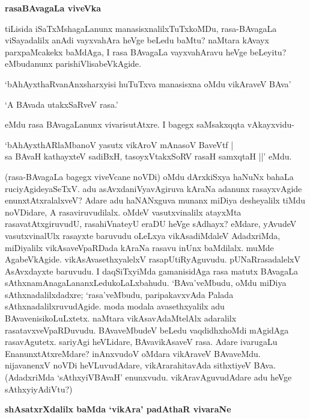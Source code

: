 {\bigskip
\noindent
{\large\bf rasaBAvagaLa viveVka}}\label{page224}
\medskip

\noindent
tiLisida iSaTxMshagaLanunx manasisxnalilxTuTxkoMDu, rasa-BAvagaLa viSayadalilx anAdi vayxvahAra heVge beLedu baMtu? naMtara kAvayx parxpaMcakekx baMdAga, I rasa BAvagaLa vayxvahAravu heVge beLeyitu? eMbudanunx parishiVlisabeVkAgide.

`bAhAyxthaRvanAnxsharxyisi huTuTxva manasisxna oMdu vikAraveV BAva'

`A BAvada utakxSaRveV rasa.'

eMdu rasa BAvagaLanunx vivarisutAtxre. I bagegx saMsakxqqta vAkayxvidu-

\begin{shloka}
`bAhAyxthARlaMbanoV yasutx vikAroV mAnasoV BaveVtf |\\\label{225}
sa BAvaH kathayxteV sadiBxH, tasoyxVtakxSoRV rasaH samxqtaH ||' eMdu.
\end{shloka}

\noindent
(rasa-BAvagaLa bagegx viveVcane noVDi) oMdu dArxkiSxya haNuNx bahaLa ruciyAgide\-yaSeTxV. adu asAvxda\-niVyavAgiruva kAraNa adanunx rasayxvAgide enunxtAtxralalxveV? Adare adu haNANxguva munanx miDi\-ya desheyalilx tiMdu noVDidare, A rasaviruvudilalx. oMdeV vasutxvinalilx atayxMta rasavatAtxgiruvudU, rasahiVnateyU eraDU heVge sAdhayx? eMdare, yAvudeV vasutxvinalUlx rasayxte baruvudu oLeLxya vikAsadiMdaleV AdadxriMda, miDiyalilx vikAsaveVpaRDada kAraNa rasavu inUnx baMdilalx. muMde Aga\-beVkA\-gide. vikAsAvasethxyalelxV rasapUtiRyAguvudu. pUNaRrasadalelxV AsAvxdayxte baruvudu. I daqSiTx\-yiMda gamanisidAga rasa matutx BAvagaLa sAthxnamAnagaLananxLedukoLaLxbahudu. `BAva'veMbudu, oMdu miDiya sAthxnadalilxdadxre; `rasa'veMbudu, paripakavxvAda Palada sAthxnadalilxruvudAgide. moda modala avasethxyalilx adu BAvavenisikoLuLxtetx. naMtara vikAsavAdaMtelAlx adaralilx rasatavxveVpaRDuvudu. BAva\-veMbudeV beLedu vaqdidhxhoMdi mAgidAga rasavAgutetx. sariyAgi heVLidare, BAvavikAsaveV rasa. Adare ivarugaLu EnanunxtAtxreMdare? inAnxvudoV oMdara vikAraveV BAvaveMdu. nijavanenxV noVDi heVLuvu\-dAdare, vikArarahitavAda sithxtiyeV BAva. (AdadxriMda `sAthxyiVBAvaH' enunxvudu. vikAravAguvu\-dAdare adu heVge sAthxyiyAdiVtu?)

{\bigskip
\noindent
{\large\bf shAsatxrXdalilx baMda `vikAra' padAthaR vivaraNe}}\label{page225}
\medskip

